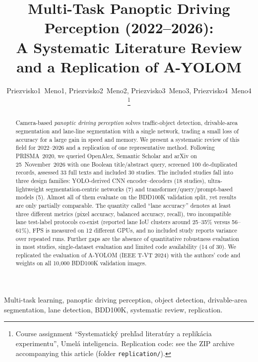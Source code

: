 \documentclass[journal,onecolumn]{IEEEtran}
\begin{document}
\title{Multi-Task Panoptic Driving Perception (2022--2026):\\ A Systematic Literature Review and a Replication of A-YOLOM}

\author{Priezvisko1~Meno1, Priezvisko2~Meno2, Priezvisko3~Meno3, Priezvisko4~Meno4%
\thanks{Course assignment ``Systematick\'y preh\v{l}ad literat\'ury a replik\'acia experimentu'', Umel\'a inteligencia. Replication code: see the ZIP archive accompanying this article (folder \texttt{replication/}).}}


\maketitle

\begin{abstract}
Camera-based \emph{panoptic driving perception} solves traffic-object detection, drivable-area segmentation and lane-line segmentation with a single network, trading a small loss of accuracy for a large gain in speed and memory. We present a systematic review of this field for 2022--2026 and a replication of one representative method. Following PRISMA~2020, we queried OpenAlex, Semantic Scholar and arXiv on 25~November~2026 with one Boolean title/abstract query, screened 100 de-duplicated records, assessed 33 full texts and included 30 studies. The included studies fall into three design families: YOLO-derived CNN encoder--decoders (18 studies), ultra-lightweight segmentation-centric networks (7) and transformer/query/prompt-based models (5). Almost all of them evaluate on the BDD100K validation split, yet results are only partially comparable. The quantity called ``lane accuracy'' denotes at least three different metrics (pixel accuracy, balanced accuracy, recall), two incompatible lane test-label protocols co-exist (reported lane IoU clusters around 25--35\% versus 56--61\%), FPS is measured on 12 different GPUs, and no included study reports variance over repeated runs. Further gaps are the absence of quantitative robustness evaluation in most studies, single-dataset evaluation and limited code availability (14 of 30). We replicated the evaluation of A-YOLOM (IEEE T-VT 2024) with the authors' code and weights on all 10{,}000 BDD100K validation images. \ReplAbstractSentence
\end{abstract}

\begin{IEEEkeywords}
Multi-task learning, panoptic driving perception, object detection, drivable-area segmentation, lane detection, BDD100K, systematic review, replication.
\end{IEEEkeywords}
\end{document}
